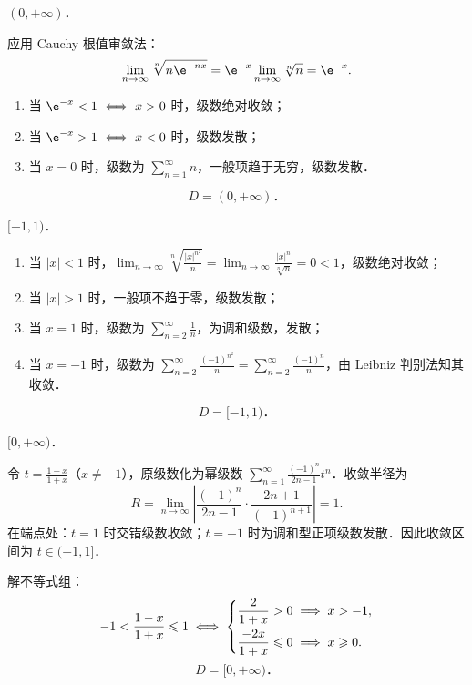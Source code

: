 \begin{solution}
     $(0, +\infty)$．

    应用 Cauchy 根值审敛法：
    \begin{equation}
        \lim_{n\to\infty} \sqrt[n]{n\e^{-nx}} = \e^{-x} \lim_{n\to\infty} \sqrt[n]{n} = \e^{-x}.
    \end{equation}
    \begin{enumerate}
        \item 当 $\e^{-x} < 1 \iff x > 0$ 时，级数绝对收敛；
        \item 当 $\e^{-x} > 1 \iff x < 0$ 时，级数发散；
        \item 当 $x = 0$ 时，级数为 $\sum_{n=1}^\infty n$，一般项趋于无穷，级数发散．
    \end{enumerate}
    \begin{equation}
        \boxed{D = (0, +\infty)．}
    \end{equation}

     $[-1, 1)$．

    \begin{enumerate}
        \item 当 $|x| < 1$ 时，$\lim_{n\to\infty} \sqrt[n]{\frac{|x|^{n^2}}{n}} = \lim_{n\to\infty} \frac{|x|^n}{\sqrt[n]{n}} = 0 < 1$，级数绝对收敛；
        \item 当 $|x| > 1$ 时，一般项不趋于零，级数发散；
        \item 当 $x = 1$ 时，级数为 $\sum_{n=2}^\infty \frac{1}{n}$，为调和级数，发散；
        \item 当 $x = -1$ 时，级数为 $\sum_{n=2}^\infty \frac{(-1)^{n^2}}{n} = \sum_{n=2}^\infty \frac{(-1)^n}{n}$，由 Leibniz 判别法知其收敛．
    \end{enumerate}
    \begin{equation}
        \boxed{D = [-1, 1)．}
    \end{equation}

     $[0, +\infty)$．

    令 $t = \frac{1 - x}{1 + x}$（$x \neq -1$），原级数化为幂级数 $\sum_{n=1}^\infty \frac{(-1)^n}{2n - 1} t^n$．收敛半径为
    \begin{equation}
        R = \lim_{n\to\infty} \left| \frac{(-1)^n}{2n - 1} \cdot \frac{2n + 1}{(-1)^{n+1}} \right| = 1.
    \end{equation}
    在端点处：$t = 1$ 时交错级数收敛；$t = -1$ 时为调和型正项级数发散．因此收敛区间为 $t \in (-1, 1]$．

    解不等式组：
    \begin{equation}
        -1 < \frac{1 - x}{1 + x} \leqslant 1 \iff \begin{dcases} \frac{2}{1 + x} > 0 \implies x > -1, \\ \frac{-2x}{1 + x} \leqslant 0 \implies x \geqslant 0. \end{dcases}
    \end{equation}
    \begin{equation}
        \boxed{D = [0, +\infty)．}
    \end{equation}


\end{solution}
